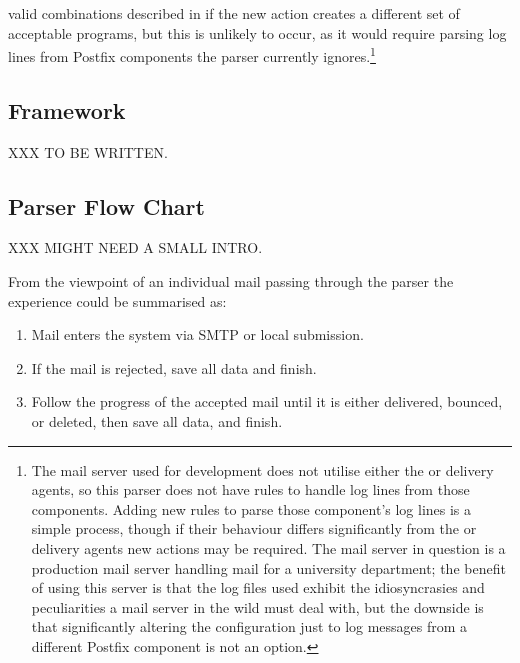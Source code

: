 valid combinations described in  if the
new action creates a different set of acceptable programs, but this is
unlikely to occur, as it would require parsing log lines from Postfix
components the parser currently ignores.\footnote{The mail server used for
development does not utilise either the  or 
delivery agents, so this parser does not have rules to handle log lines
from those components.  Adding new rules to parse those component's log
lines is a simple process, though if their behaviour differs significantly
from the  or  delivery agents new actions may be
required.  The mail server in question is a production mail server handling
mail for a university department; the benefit of using this server is that
the log files used exhibit the idiosyncrasies and peculiarities a mail
server in the wild must deal with, but the downside is that significantly
altering the configuration just to log messages from a different Postfix
component is not an option.}


\subsection{Framework}

XXX TO BE WRITTEN\@.


\subsection{Parser Flow Chart}

\label{flow-chart}

XXX MIGHT NEED A SMALL INTRO\@.

From the viewpoint of an individual mail passing through the parser the
experience could be summarised as:

\begin{enumerate}

    \item Mail enters the system via \gls{SMTP} or local submission.

    \item If the mail is rejected, save all data and finish.

    \item Follow the progress of the accepted mail until it is either
        delivered, bounced, or deleted, then save all data, and finish.

\end{enumerate}

